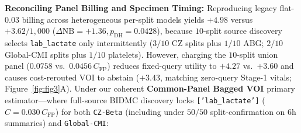 \documentclass[11pt]{article}
\begin{document}
\textbf{Reconciling Panel Billing and Specimen Timing:} Reproducing legacy flat-$0.03$ billing across heterogeneous per-split models yields $+4.98$ versus $+3.62/1{,}000$ ($\Delta\text{NB}=+1.36, p_{\text{DH}}=0.0428$), because $10$-split source discovery selects \texttt{lab\_lactate} only intermittently ($3/10$ CZ splits plus $1/10$ ABG; $2/10$ Global-CMI splits plus $1/10$ platelets). However, charging the $10$-split union panel ($0.0758$ vs.\ $0.0456\,C_{\text{FP}}$) reduces fixed-query utility to $+4.27$ vs.\ $+3.60$ and causes cost-rerouted VOI to abstain ($+3.43$, matching zero-query Stage-1 vitals; Figure~\ref{fig:fig3}A). Under our coherent \textbf{Common-Panel Bagged VOI} primary estimator---where full-source BIDMC discovery locks \texttt{['lab\_lactate']} ($C = 0.030\,C_{\text{FP}}$) for both \texttt{CZ-Beta} (including under $50/50$ split-confirmation on $6\text{h}$ summaries) and \texttt{Global-CMI}:
\end{document}

